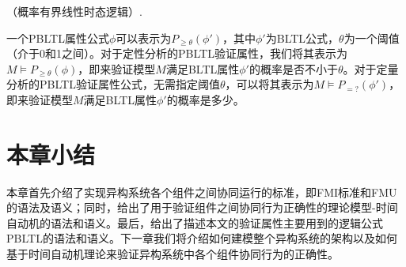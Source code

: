 \begin{define}\label{def:pbltl}
（概率有界线性时态逻辑）.

一个PBLTL属性公式$\phi$可以表示为$P_{\geq \theta}(\phi')$，其中$\phi'$为BLTL公式，$\theta$为一个阈值（介于0和1之间）。对于定性分析的PBLTL验证属性，我们将其表示为$M \models P_{\geq \theta}(\phi)$，即来验证模型$M$满足BLTL属性$\phi'$的概率是否不小于$\theta$。对于定量分析的PBLTL验证属性公式，无需指定阈值$\theta$，可以将其表示为$M \models P_{=?}(\phi')$，即来验证模型$M$满足BLTL属性$\phi'$的概率是多少。
\end{define}


\section{本章小结}
本章首先介绍了实现异构系统各个组件之间协同运行的标准，即FMI标准和FMU的语法及语义；同时，给出了用于验证组件之间协同行为正确性的理论模型-时间自动机的语法和语义。最后，给出了描述本文的验证属性主要用到的逻辑公式PBLTL的语法和语义。下一章我们将介绍如何建模整个异构系统的架构以及如何基于时间自动机理论来验证异构系统中各个组件协同行为的正确性。
